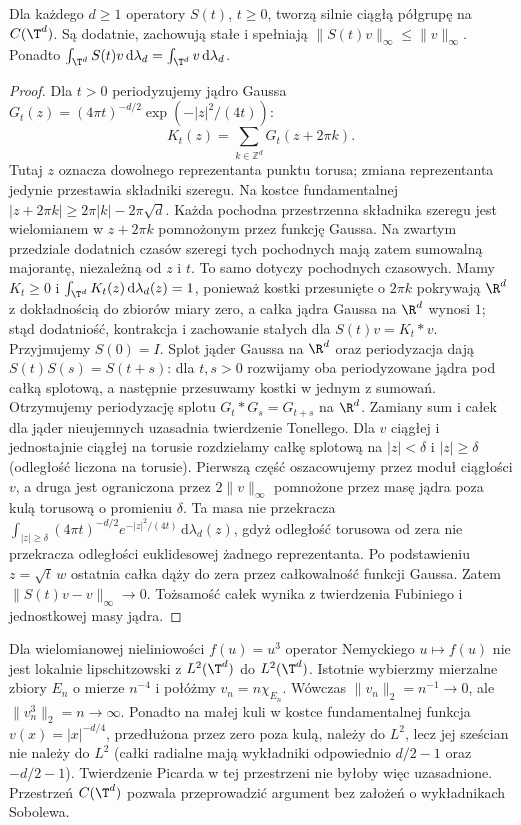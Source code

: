 \begin{lemat}
\label{lem:pde25-heat}
Dla każdego $d\ge1$ operatory $S(t)$, $t\ge0$, tworzą silnie
ciągłą półgrupę na $C(\T^d)$. Są dodatnie, zachowują stałe
i spełniają $\|S(t)v\|_\infty\le\|v\|_\infty$.
Ponadto $\int_{\T^d}S(t)v\,\mathrm d\lambda_d
=\int_{\T^d}v\,\mathrm d\lambda_d$.
\end{lemat}
\begin{proof}
Dla $t>0$ periodyzujemy jądro Gaussa
$G_t(z)=(4\pi t)^{-d/2}\exp(-|z|^2/(4t))$:
\[
 K_t(z)=\sum_{k\in\mathbb Z^d}G_t(z+2\pi k).
\]
Tutaj $z$ oznacza dowolnego reprezentanta punktu torusa;
zmiana reprezentanta jedynie przestawia składniki szeregu.
Na kostce fundamentalnej $|z+2\pi k|\ge 2\pi|k|-2\pi\sqrt d$.
Każda pochodna przestrzenna składnika szeregu jest
wielomianem w $z+2\pi k$ pomnożonym przez funkcję Gaussa.
Na zwartym przedziale dodatnich czasów szeregi tych
pochodnych mają zatem sumowalną majorantę, niezależną
od $z$ i $t$. To samo dotyczy pochodnych czasowych.
Mamy $K_t\ge0$ i
$\int_{\T^d}K_t(z)\,\mathrm d\lambda_d(z)=1$,
ponieważ kostki przesunięte o $2\pi k$ pokrywają
$\R^d$ z dokładnością do zbiorów miary zero, a całka
jądra Gaussa na $\R^d$ wynosi $1$;
stąd dodatniość, kontrakcja i zachowanie stałych dla
$S(t)v=K_t*v$. Przyjmujemy $S(0)=I$.
Splot jąder Gaussa na $\R^d$ oraz periodyzacja dają
$S(t)S(s)=S(t+s)$: dla $t,s>0$ rozwijamy oba
periodyzowane jądra pod całką splotową, a następnie
przesuwamy kostki w jednym z sumowań. Otrzymujemy
periodyzację splotu $G_t*G_s=G_{t+s}$ na $\R^d$.
Zamiany sum i całek dla jąder nieujemnych uzasadnia
twierdzenie Tonellego. Dla $v$ ciągłej
i jednostajnie ciągłej na torusie rozdzielamy całkę splotową
na $|z|<\delta$ i $|z|\ge\delta$ (odległość liczona na torusie).
Pierwszą część oszacowujemy przez moduł ciągłości $v$,
a druga jest ograniczona przez $2\|v\|_\infty$
pomnożone przez masę jądra poza kulą torusową
o promieniu $\delta$. Ta masa nie przekracza
$\int_{|z|\ge\delta}(4\pi t)^{-d/2}
e^{-|z|^2/(4t)}\,\mathrm d\lambda_d(z)$,
gdyż odległość torusowa od zera nie przekracza
odległości euklidesowej żadnego reprezentanta.
Po podstawieniu $z=\sqrt t\,w$ ostatnia całka
dąży do zera przez całkowalność funkcji Gaussa.
Zatem $\|S(t)v-v\|_\infty\to0$. Tożsamość całek wynika
z twierdzenia Fubiniego i jednostkowej masy jądra.
\end{proof}

\begin{uwaga}
Dla wielomianowej nieliniowości $f(u)=u^3$ operator
Nemyckiego $u\mapsto f(u)$ nie jest lokalnie
lipschitzowski z $L^2(\T^d)$ do $L^2(\T^d)$.
Istotnie wybierzmy mierzalne zbiory $E_n$ o mierze
$n^{-4}$ i połóżmy $v_n=n\chi_{E_n}$.
Wówczas $\|v_n\|_2=n^{-1}\to0$, ale
$\|v_n^3\|_2=n\to\infty$.
Ponadto na małej kuli w kostce fundamentalnej
funkcja $v(x)=|x|^{-d/4}$, przedłużona przez zero
poza kulą, należy do $L^2$, lecz jej sześcian
nie należy do $L^2$ (całki radialne mają wykładniki
odpowiednio $d/2-1$ oraz $-d/2-1$). Twierdzenie Picarda w tej przestrzeni
nie byłoby więc uzasadnione. Przestrzeń $C(\T^d)$ pozwala
przeprowadzić argument bez założeń o wykładnikach Sobolewa.
\end{uwaga}

